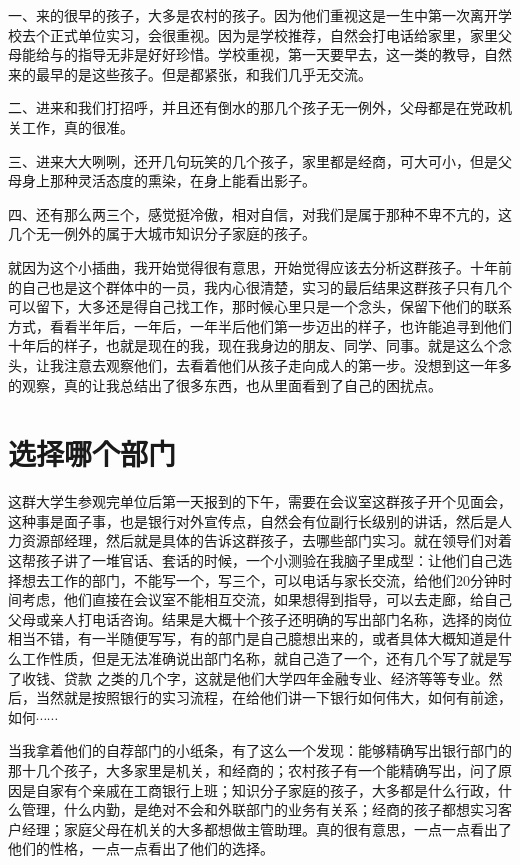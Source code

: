 一、来的很早的孩子，大多是农村的孩子。因为他们重视这是一生中第一次离开学校去个正式单位实习，会很重视。因为是学校推荐，自然会打电话给家里，家里父母能给与的指导无非是好好珍惜。学校重视，第一天要早去，这一类的教导，自然来的最早的是这些孩子。但是都紧张，和我们几乎无交流。

二、进来和我们打招呼，并且还有倒水的那几个孩子无一例外，父母都是在党政机关工作，真的很准。

三、进来大大咧咧，还开几句玩笑的几个孩子，家里都是经商，可大可小，但是父母身上那种灵活态度的熏染，在身上能看出影子。

四、还有那么两三个，感觉挺冷傲，相对自信，对我们是属于那种不卑不亢的，这几个无一例外的属于大城市知识分子家庭的孩子。

就因为这个小插曲，我开始觉得很有意思，开始觉得应该去分析这群孩子。十年前的自己也是这个群体中的一员，我内心很清楚，实习的最后结果这群孩子只有几个可以留下，大多还是得自己找工作，那时候心里只是一个念头，保留下他们的联系方式，看看半年后，一年后，一年半后他们第一步迈出的样子，也许能追寻到他们十年后的样子，也就是现在的我，现在我身边的朋友、同学、同事。就是这么个念头，让我注意去观察他们，去看着他们从孩子走向成人的第一步。没想到这一年多的观察，真的让我总结出了很多东西，也从里面看到了自己的困扰点。

\section{选择哪个部门}


这群大学生参观完单位后第一天报到的下午，需要在会议室这群孩子开个见面会，这种事是面子事，也是银行对外宣传点，自然会有位副行长级别的讲话，然后是人力资源部经理，然后就是具体的告诉这群孩子，去哪些部门实习。就在领导们对着这帮孩子讲了一堆官话、套话的时候，一个小测验在我脑子里成型：让他们自己选择想去工作的部门，不能写一个，写三个，可以电话与家长交流，给他们20分钟时间考虑，他们直接在会议室不能相互交流，如果想得到指导，可以去走廊，给自己父母或亲人打电话咨询。结果是大概十个孩子还明确的写出部门名称，选择的岗位相当不错，有一半随便写写，有的部门是自己臆想出来的，或者具体大概知道是什么工作性质，但是无法准确说出部门名称，就自己造了一个，还有几个写了就是写了收钱、贷款 之类的几个字，这就是他们大学四年金融专业、经济等等专业。然后，当然就是按照银行的实习流程，在给他们讲一下银行如何伟大，如何有前途，如何$\cdots\cdots$

当我拿着他们的自荐部门的小纸条，有了这么一个发现：能够精确写出银行部门的那十几个孩子，大多家里是机关，和经商的；农村孩子有一个能精确写出，问了原因是自家有个亲戚在工商银行上班；知识分子家庭的孩子，大多都是什么行政，什么管理，什么内勤，是绝对不会和外联部门的业务有关系；经商的孩子都想实习客户经理；家庭父母在机关的大多都想做主管助理。真的很有意思，一点一点看出了他们的性格，一点一点看出了他们的选择。

